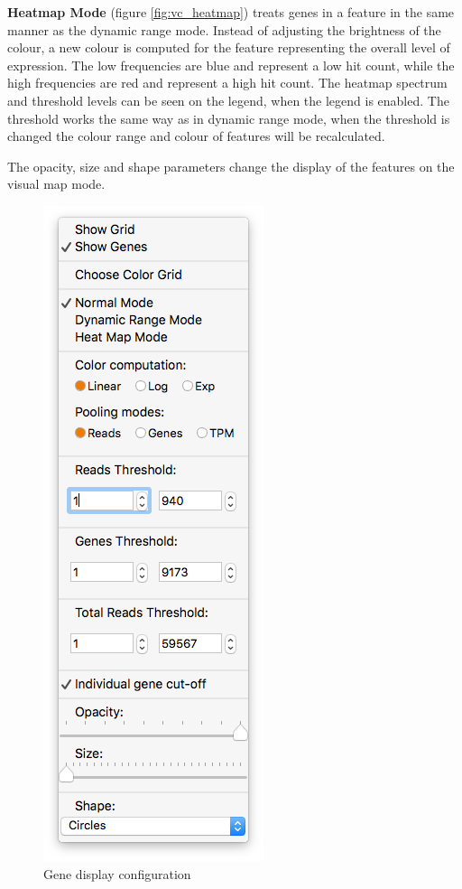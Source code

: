 \documentclass[10pt,a4paper,titlepage]{book}
\begin{document}
\textbf{Heatmap Mode} (figure \ref{fig:vc_heatmap}) treats genes in a feature in the same manner as the dynamic range mode. Instead of adjusting the brightness of the colour, a new colour is computed for the feature representing the overall level of expression. The low frequencies are blue and represent a low hit count, while the high frequencies are red and represent a high hit count. The heatmap spectrum and threshold levels can be seen on the legend, when the legend is enabled.
The threshold works the same way as in dynamic range mode, when the threshold is changed the colour range and colour of features will be recalculated.

The opacity, size and shape parameters change the display of the features on the visual map mode.

\begin{figure}[h]
	\centering
	\includegraphics[scale=0.5]{./Pictures/menu_1}
	\caption{Gene display configuration}
	\label{fig:gene_display_config}
\end{figure}
\end{document}
